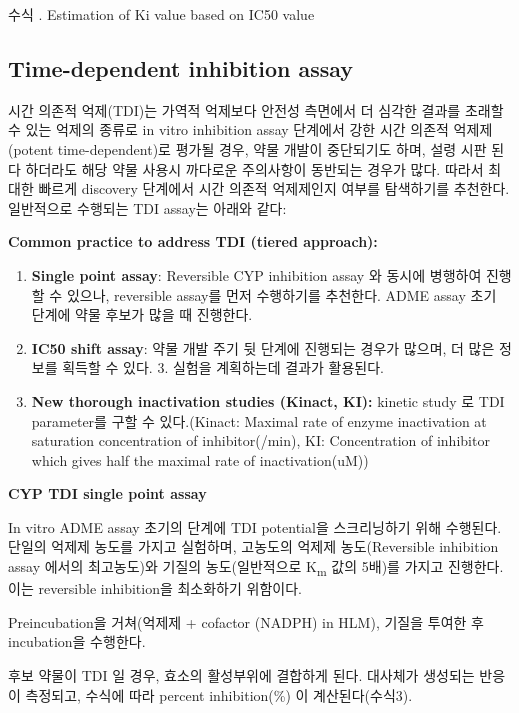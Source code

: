 \documentclass[
  11pt,
  krantz2, a4paper, twoside]{krantz}
\providecommand{\tightlist}{%
  \setlength{\itemsep}{0pt}\setlength{\parskip}{0pt}}
\begin{document}
수식 . Estimation of Ki value based on IC50 value

\subsection{Time-dependent inhibition assay}\label{time-dependent-inhibition-assay}

시간 의존적 억제(TDI)는 가역적 억제보다 안전성 측면에서 더 심각한 결과를 초래할
수 있는 억제의 종류로 in vitro inhibition assay 단계에서 강한 시간 의존적 억제제(potent time-dependent)로
평가될 경우, 약물 개발이 중단되기도 하며, 설령 시판 된다 하더라도 해당
약물 사용시 까다로운 주의사항이 동반되는 경우가 많다. 따라서 최대한 빠르게
discovery 단계에서 시간 의존적 억제제인지 여부를 탐색하기를 추천한다. 일반적으로
수행되는 TDI assay는 아래와 같다:

\textbf{Common practice to address TDI (tiered approach):}

\begin{enumerate}
\def\labelenumi{\arabic{enumi}.}
\tightlist
\item
  \textbf{Single point assay}: Reversible CYP inhibition assay 와 동시에 병행하여 진행할 수 있으나, reversible assay를 먼저 수행하기를 추천한다. ADME assay 초기 단계에 약물 후보가 많을 때 진행한다.
\item
  \textbf{IC50 shift assay}: 약물 개발 주기 뒷 단계에 진행되는 경우가 많으며, 더 많은 정보를 획득할 수 있다. 3. 실험을 계획하는데 결과가 활용된다.
\item
  \textbf{New thorough inactivation studies (Kinact, KI):} kinetic study 로 TDI parameter를 구할 수 있다.(Kinact: Maximal rate of enzyme
  inactivation at saturation concentration of inhibitor(/min), KI: Concentration of inhibitor which gives half the maximal rate of
  inactivation(uM))
\end{enumerate}

\textbf{CYP TDI single point assay}

In vitro ADME assay 초기의 단계에 TDI potential을 스크리닝하기 위해 수행된다. 단일의 억제제 농도를 가지고 실험하며, 고농도의 억제제 농도(Reversible inhibition assay 에서의 최고농도)와 기질의 농도(일반적으로 K\textsubscript{m} 값의 5배)를 가지고 진행한다. 이는 reversible inhibition을 최소화하기 위함이다.

Preincubation을 거쳐(억제제 + cofactor (NADPH) in HLM), 기질을 투여한 후 incubation을 수행한다.

후보 약물이 TDI 일 경우, 효소의 활성부위에 결합하게 된다. 대사체가 생성되는 반응이 측정되고, 수식에 따라 percent inhibition(\%) 이 계산된다(수식3).
\end{document}
